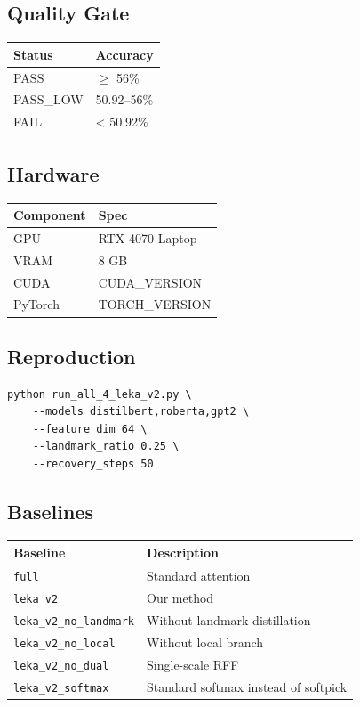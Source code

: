 \subsection{Quality Gate}

\begin{table}[H]
\centering
\small
\begin{tabular}{ll}
\toprule
\textbf{Status} & \textbf{Accuracy} \\
\midrule
PASS & $\ge$ 56\% \\
PASS\_LOW & 50.92--56\% \\
FAIL & < 50.92\% \\
\bottomrule
\end{tabular}
\end{table}

\subsection{Hardware}

\begin{table}[H]
\centering
\small
\begin{tabular}{ll}
\toprule
\textbf{Component} & \textbf{Spec} \\
\midrule
GPU & RTX 4070 Laptop \\
VRAM & 8 GB \\
CUDA & {{CUDA\_VERSION}} \\
PyTorch & {{TORCH\_VERSION}} \\
\bottomrule
\end{tabular}
\end{table}

\subsection{Reproduction}

\begin{lstlisting}
python run_all_4_leka_v2.py \
    --models distilbert,roberta,gpt2 \
    --feature_dim 64 \
    --landmark_ratio 0.25 \
    --recovery_steps 50
\end{lstlisting}

\subsection{Baselines}

\begin{table}[H]
\centering
\small
\begin{tabular}{ll}
\toprule
\textbf{Baseline} & \textbf{Description} \\
\midrule
\texttt{full} & Standard attention \\
\texttt{leka\_v2} & Our method \\
\texttt{leka\_v2\_no\_landmark} & Without landmark distillation \\
\texttt{leka\_v2\_no\_local} & Without local branch \\
\texttt{leka\_v2\_no\_dual} & Single-scale RFF \\
\texttt{leka\_v2\_softmax} & Standard softmax instead of softpick \\
\bottomrule
\end{tabular}
\end{table}

